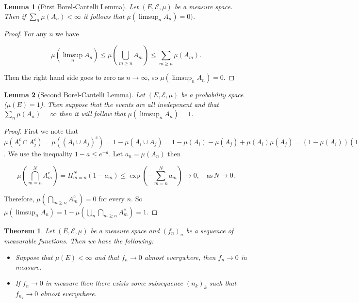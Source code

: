 \documentclass[
]{book}
\providecommand{\tightlist}{%
  \setlength{\itemsep}{0pt}\setlength{\parskip}{0pt}}
\newtheorem{theorem}{Theorem}[chapter]
\newtheorem{lemma}{Lemma}[chapter]
\theoremstyle{definition}
\theoremstyle{definition}
\theoremstyle{definition}
\theoremstyle{definition}
\theoremstyle{remark}
\begin{document}
\begin{lemma}[First Borel-Cantelli Lemma]
Let \((E, \mathcal{E}, \mu)\) be a measure space. Then if \(\sum_n \mu(A_n) < \infty\) it follows that \(\mu(\limsup_n A_n) = 0)\).
\end{lemma}

\begin{proof}
For any \(n\) we have

\[ \mu(\limsup_n A_n) \leq \mu \left( \bigcup_{m \geq n} A_m\right) \leq \sum_{m \geq n} \mu(A_m). \]

Then the right hand side goes to zero as \(n \rightarrow \infty\), so \(\mu(\limsup_n A_n) = 0\).
\end{proof}

\begin{lemma}[Second Borel-Cantelli Lemma]
Let \((E, \mathcal{E}, \mu)\) be a probability space (\(\mu(E) =1\)). Then suppose that the events are all inedepenent and that \(\sum_n \mu(A_n) = \infty\) then it will follow that \(\mu(\limsup_n A_n) =1\).
\end{lemma}

\begin{proof}
First we note that \(\mu(A_i^c \cap A_j^c) = \mu ((A_i \cup A_j)^c) = 1 - \mu(A_i \cup A_j) = 1 - \mu(A_i) - \mu(A_j)+ \mu(A_i)\mu(A_j) = (1-\mu(A_i))(1-\mu(A_j))\).
We use the inequality \(1-a \leq e^{-a}\). Let \(a_n = \mu(A_n)\) then

\[ \mu \left( \bigcap_{m=n}^N A_m^c \right) = \Pi_{m=n}^N (1-a_m) \leq \exp \left( - \sum_{m=n}^N a_m \right) \rightarrow 0, \quad \mbox{as}\, N \rightarrow 0. \]

Therefore, \(\mu \left( \bigcap_{m \geq n} A_m^c \right) = 0\) for every \(n\). So \(\mu(\limsup_n A_n ) = 1- \mu(\bigcup_n \bigcap_{m \geq n} A_m^c) = 1\).
\end{proof}

\begin{theorem}

Let \((E, \mathcal{E}, \mu)\) be a measure space and \((f_n)_n\) be a sequence of measurable functions. Then we have the following:

\begin{itemize}
\tightlist
\item
  Suppose that \(\mu(E) < \infty\) and that \(f_n \rightarrow 0\) almost everywhere, then \(f_n \rightarrow 0\) in measure.
\item
  If \(f_n \rightarrow 0\) in measure then there exists some subsequence \((n_k)_k\) such that \(f_{n_k} \rightarrow 0\) almost everywhere.
\end{itemize}

\end{theorem}
\end{document}
